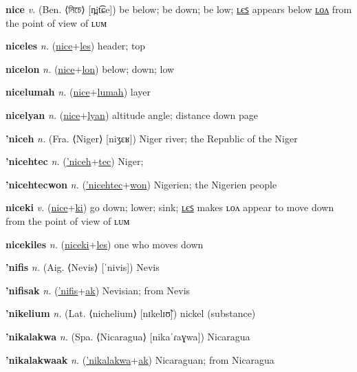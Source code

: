 \textbf{\hypertarget{nice}{nice}} \textit{v.} (Ben. ⟨{\bengali{}নিচে}⟩ [n̪it͡ɕe])
be below; be down; be low; \hyperlink{niceles}{ʟєꜱ} appears below \hyperlink{nicelon}{ʟᴏᴧ} from the point of view of ʟᴜᴍ

\textbf{\hypertarget{niceles}{niceles}} \textit{n.} (\hyperlink{nice}{nice}+\allowbreak \hyperlink{les}{les})
header; top

\textbf{\hypertarget{nicelon}{nicelon}} \textit{n.} (\hyperlink{nice}{nice}+\allowbreak \hyperlink{lon}{lon})
below; down; low

\textbf{\hypertarget{nicelumah}{nicelumah}} \textit{n.} (\hyperlink{nice}{nice}+\allowbreak \hyperlink{lumah}{lumah})
layer

\textbf{\hypertarget{nicelyan}{nicelyan}} \textit{n.} (\hyperlink{nice}{nice}+\allowbreak \hyperlink{lyan}{lyan})
altitude angle; distance down page

\textbf{\hypertarget{'niceh}{'niceh}} \textit{n.} (Fra. ⟨Niger⟩ [niʒɛʁ])
Niger river; the Republic of the Niger

\textbf{\hypertarget{'nicehtec}{'nicehtec}} \textit{n.} (\hyperlink{'niceh}{'niceh}+\allowbreak \hyperlink{tec}{tec})
Niger;

\textbf{\hypertarget{'nicehtecwon}{'nicehtecwon}} \textit{n.} (\hyperlink{'nicehtec}{'nicehtec}+\allowbreak \hyperlink{won}{won})
Nigerien; the Nigerien people

\textbf{\hypertarget{niceki}{niceki}} \textit{v.} (\hyperlink{nice}{nice}+\allowbreak \hyperlink{ki}{ki})
go down; lower; sink; \hyperlink{nicekiles}{ʟєꜱ} makes ʟᴏᴧ appear to move down from the point of view of ʟᴜᴍ

\textbf{\hypertarget{nicekiles}{nicekiles}} \textit{n.} (\hyperlink{niceki}{niceki}+\allowbreak \hyperlink{les}{les})
one who moves down

\textbf{\hypertarget{'nifis}{'nifis}} \textit{n.} (Aig. ⟨Nevis⟩ [ˈnivis])
Nevis

\textbf{\hypertarget{'nifisak}{'nifisak}} \textit{n.} (\hyperlink{'nifis}{'nifis}+\allowbreak \hyperlink{ak}{ak})
Nevisian; from Nevis

\textbf{\hypertarget{'nikelium}{'nikelium}} \textit{n.} (Lat. ⟨nichelium⟩ [nɪkelɪʊ̃])
nickel (substance)

\textbf{\hypertarget{'nikalakwa}{'nikalakwa}} \textit{n.} (Spa. ⟨Nicaragua⟩ [nikaˈɾaɣwa])
Nicaragua

\textbf{\hypertarget{'nikalakwaak}{'nikalakwaak}} \textit{n.} (\hyperlink{'nikalakwa}{'nikalakwa}+\allowbreak \hyperlink{ak}{ak})
Nicaraguan; from Nicaragua

